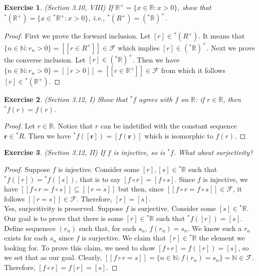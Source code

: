 \documentclass[a4paper, 11pt, openany]{book}
\theoremstyle{plain}
\newtheorem{exercise}{Exercise}[chapter]
\theoremstyle{plain}
\newcommand{\mb}{\mathbf}
\newcommand{\mc}{\mathcal}
\newcommand{\N}{\mathbb{N}}
\newcommand{\R}{\mathbb{R}}
\newcommand{\hyp}{{}^*}
\begin{document}
  \begin{exercise}
    (Section 3.10, VIII)
    If $\R^+=\{x \in \R: x>0\}$, show that $\hyp (\R^+)=\{x \in \hyp \R^+:x>0\}$, i.e., $\hyp (R^+)=(\hyp \R)^+$.
  \end{exercise}
  \begin{proof}
    First we prove the forward inclusion. Let $[r] \in \hyp (R^+)$. It means that $\{n \in \N: r_n>0\}=[[r \in R^+]] \in \mc{F}$ which implies $[r] \in (\hyp \R)^+$. Next we prove the converse inclusion. Let $[r] \in (\hyp \R)^+$. Then we have $\{n \in \N: r_n>0\}=[[r>0]]=[[r \in \R^+]] \in \mc{F}$ from which it follows $[r] \in \hyp(\R^+)$.
  \end{proof}

  \begin{exercise}
    (Section 3.12, I)
    Show that $\hyp f$ agrees with $f$ on $\R$: if $r \in \R$, then $\hyp f(r)=f(r)$.
  \end{exercise}
  \begin{proof}
    Let $r \in \R$. Notice that $r$ can be indetified with the constant sequence $\mb{r} \in \hyp R$. Then we have $\hyp f([\mb{r}])=[f(\mb{r})]$ which is isomorphic to $f(r)$.
  \end{proof}
  \begin{exercise}
    (Section 3.12, II)
    If $f$ is injective, so is $\hyp f$. What about surjectivity?
  \end{exercise}
  \begin{proof}
    Suppose $f$ is injective. Consider some $[r], [s] \in \hyp \R$ such that $\hyp f([r])=\hyp f([s])$, that is to say $[f \circ r]=[f \circ s]$. Since $f$ is injective, we have $[[f \circ r=f \circ s]] \subseteq [[r =s]]$ but then, since $[[f \circ r=f \circ s]] \in \mc{F}$, it follows $[[r=s]] \in \mc{F}$. Therefore, $[r]=[s]$. \\

    Yes, surjecitivity is preserved. Suppose $f$ is surjective. Consider some $[s] \in \hyp \R$. Our goal is to prove that there is some $[r] \in \hyp \R$ such that $\hyp f([r])=[s]$. Define sequenece $(r_n)$ such that, for each $s_n$, $f(r_n)=s_n$. We know such a $r_n$ exists for each $s_n$ since $f$ is surjective. We claim that $[r] \in \hyp \R$ the element we looking for. To prove this claim, we need to show $[f \circ r]=f([r])=[s]$, so we set that as our goal. Clearly, $[[f \circ r = s]]=\{n \in \N: f(r_n)=s_n\}=\N \in \mc{F}$. Therefore, $[f \circ r]=f[r] = [s]$. 
  \end{proof}
\end{document}
